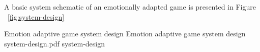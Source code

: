 A basic system schematic of an emotionally adapted game is presented in Figure ~\ref{fig:system-design}

\img
{Emotion adaptive game system design}
{Emotion adaptive game system design}
{system-design.pdf}
{system-design}


